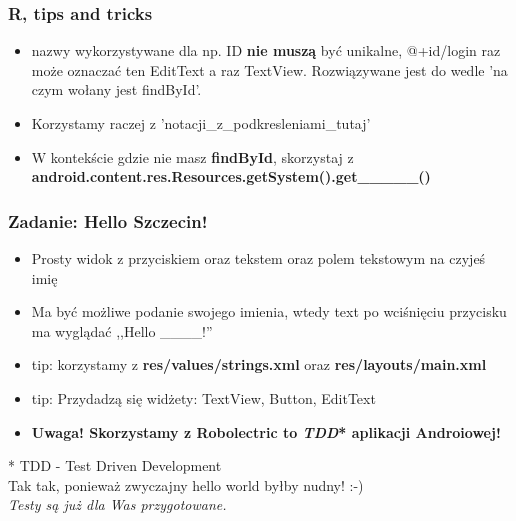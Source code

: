 \documentclass{beamer}
\begin{document}
\begin{frame}\frametitle{R, tips and tricks}
\begin{itemize}
 \item nazwy wykorzystywane dla np. ID \textbf{nie muszą} być unikalne, @+id/login raz może oznaczać ten EditText a raz TextView.
       Rozwiązywane jest do wedle 'na czym wołany jest findById'.
 \pause \item Korzystamy raczej z 'notacji\_z\_podkresleniami\_tutaj'
 \pause \item W kontekście gdzie nie masz \textbf{findById}, skorzystaj z \textbf{android.content.res.Resources.getSystem().get\_\_\_\_\_()}
\end{itemize}
\end{frame}

\begin{frame}\frametitle{Zadanie: Hello Szczecin!}
\begin{itemize}
 \item Prosty widok z przyciskiem oraz tekstem oraz polem tekstowym na czyjeś imię
 \item Ma być możliwe podanie swojego imienia, wtedy text po wciśnięciu przycisku ma wyglądać ,,Hello \_\_\_\_!''
 \item tip: korzystamy z \textbf{res/values/strings.xml} oraz \textbf{res/layouts/main.xml}
 \item tip: Przydadzą się widżety: TextView, Button, EditText
 \pause \item \textbf{Uwaga! Skorzystamy z \textbf{Robolectric} to \textit{TDD}* aplikacji Androiowej!}
\end{itemize}

* TDD - Test Driven Development\\
Tak tak, ponieważ zwyczajny hello world byłby nudny! :-)\\
\textit{Testy są już dla Was przygotowane.}
\end{frame}

\end{document}
